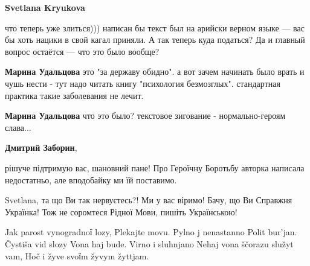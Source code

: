 \begin{itemize}
\begin{itemize}
\textbf{Svetlana Kryukova} 

что теперь уже злиться))) написан бы текст был на арийски верном языке — вас бы
хоть нацики в свой кагал приняли. А так теперь куда податься? Да и главный
вопрос остаётся — что это было вообще?

 
\textbf{Марина Удальцова} это "за державу обидно". а вот зачем начинать было врать и чушь нести - тут надо читать книгу "психология безмозглых". стандартная практика такие заболевания не лечит.

 
\textbf{Марина Удальцова} что это было? текстовое зигование - нормально-героям слава...

 
\textbf{Дмитрий Заборин}, 

рішуче підтримую вас, шановний пане! Про Героїчну Боротьбу авторка написала недостатньо, але вподобайку ми їй поставимо.

 
Svetlana, та що Ви так нервуєтесь?! Ми у вас віримо! Бачу, що Ви Справжня Українка! Тож не соромтеся Рідної Мови, пишіть Українською!

 

\obeycr
	Jak parost vynogradnoї lozy,
	Plekajte movu. Pylno j nenastanno
	Polit bur’jan. Čystiša vid slozy
	Vona haj bude. Virno i sluhnjano
	Nehaj vona ščorazu služyt vam,
	Hoč i žyve svoїm žyvym žyttjam.
\restorecr


\end{itemize}
\end{itemize}
